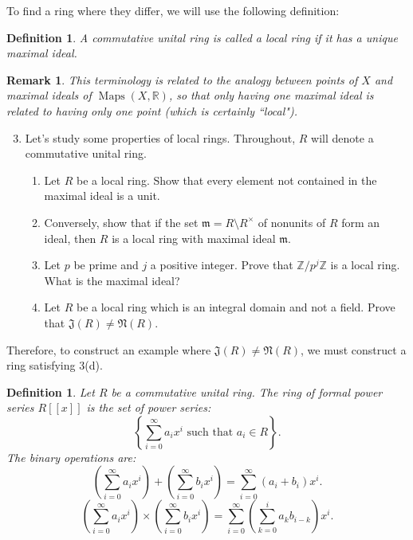 \documentclass[11pt]{article}
\newtheorem*{remark}{Remark}
\newtheorem{definition}[theorem]{Definition}
\newcommand{\maps}{\operatorname{Maps}}
\newcommand{\bR}{\mathbb{R}}
\newcommand{\bZ}{\mathbb{Z}}
\newcommand{\fJ}{\mathfrak{J}}
\newcommand{\fN}{\mathfrak{N}}
\newcommand{\fm}{\mathfrak{m}}
\begin{document}
To find a ring where they differ, we will use the following definition:
\begin{definition}
  A commutative unital ring is called a \textit{local ring} if it has a unique maximal ideal.
\end{definition}
\begin{remark}
  This terminology is related to the analogy between points of $X$ and maximal ideals of $\maps(X,\bR)$, so that only having one maximal ideal is related to having only one point (which is certainly ``local").
\end{remark}
\begin{enumerate}
  \setcounter{enumi}{2}
  \item{
  Let's study some properties of local rings.  Throughout, $R$ will denote a commutative unital ring.
  \begin{enumerate}
    \item{
    Let $R$ be a local ring.  Show that every element not contained in the maximal ideal is a unit.
    }
    \item{
    Conversely, show that if the set $\fm = R\setminus R^\times$ of nonunits of $R$ form an ideal, then $R$ is a local ring with maximal ideal $\fm$.
    }
    \item{
    Let $p$ be prime and $j$ a positive integer.  Prove that $\bZ/p^j\bZ$ is a local ring.  What is the maximal ideal?
    }
    \item{
    Let $R$ be a local ring which is an integral domain and not a field.  Prove that $\fJ(R)\not=\fN(R)$.
    }
  \end{enumerate}
  }
\end{enumerate}
Therefore, to construct an example where $\fJ(R)\not=\fN(R)$, we must construct a ring satisfying 3(d).
\begin{definition}
  Let $R$ be a commutative unital ring.  The \textit{ring of formal power series} $R[[x]]$ is the set of power series:
  \[\left\{\sum_{i=0}^\infty a_ix^i\text{ such that }a_i\in R\right\}.\]
  The binary operations are:
  \[\left(\sum_{i=0}^\infty a_ix^i\right) + \left(\sum_{i=0}^\infty b_ix^i\right) = \sum_{i=0}^\infty (a_i+b_i)x^i.\]
  \[\left(\sum_{i=0}^\infty a_ix^i\right) \times \left(\sum_{i=0}^\infty b_ix^i\right) = \sum_{i=0}^\infty\left(\sum_{k=0}^ia_kb_{i-k}\right)x^i.\]
\end{definition}
\end{document}
